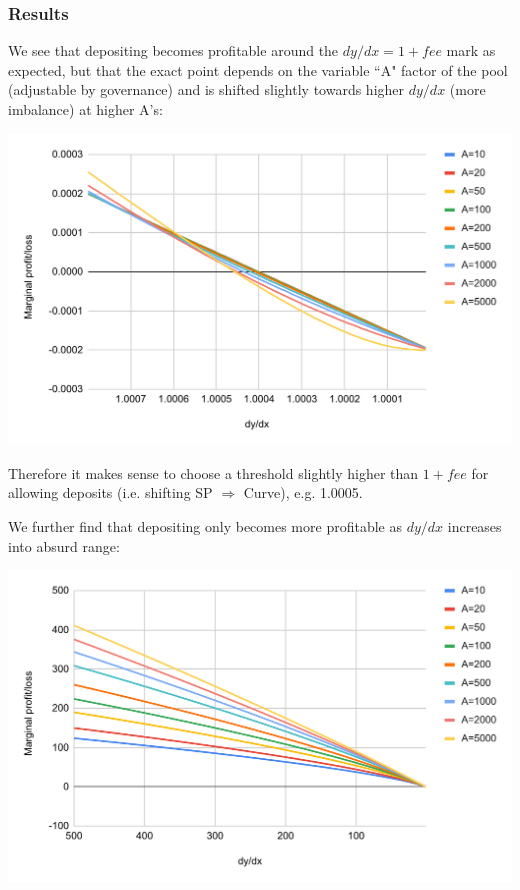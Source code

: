 \documentclass{article}
\begin{document}
\subsubsection{Results}

We see that depositing becomes profitable around the $dy/dx = 1+fee$ mark as expected, but that the exact point depends on the variable ``A" factor of the pool (adjustable by governance) and is shifted slightly towards higher $dy/dx$ (more imbalance) at higher A's:

\includegraphics[width=\linewidth]{./LUSDChickenBonds_Shifting_Profitability_1.png}

Therefore it makes sense to choose a threshold slightly higher than $1+fee$ for allowing deposits (i.e. shifting SP $\Rightarrow$ Curve), e.g. 1.0005.

We further find that depositing only becomes more profitable as $dy/dx$ increases into absurd range:

\includegraphics[width=\linewidth]{./LUSDChickenBonds_Shifting_Profitability_2.png}
\end{document}

